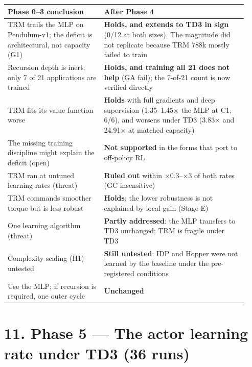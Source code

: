 \documentclass[11pt]{article}
\begin{document}
\begin{center}\small\begin{tabular}{>{\raggedright\arraybackslash}p{0.375\linewidth}>{\raggedright\arraybackslash}p{0.559\linewidth}}
\toprule
Phase 0--3 conclusion & After Phase 4 \\
\midrule
TRM trails the MLP on Pendulum-v1; the deficit is architectural, not capacity (G1) & \textbf{Holds, and extends to TD3 in sign} (0/12 at both sizes). The magnitude did not replicate because TRM 788k mostly failed to train \\
Recursion depth is inert; only 7 of 21 applications are trained & \textbf{Holds, and training all 21 does not help} (GA fail); the 7-of-21 count is now verified directly \\
TRM fits its value function worse & \textbf{Holds} with full gradients and deep supervision (1.35--1.45$\times$ the MLP at C1, 6/6), and worsens under TD3 (3.83$\times$ and 24.91$\times$ at matched capacity) \\
The missing training discipline might explain the deficit (open) & \textbf{Not supported} in the forms that port to off-policy RL \\
TRM ran at untuned learning rates (threat) & \textbf{Ruled out} within $\times$0.3--$\times$3 of both rates (GC insensitive) \\
TRM commands smoother torque but is less robust & \textbf{Holds}; the lower robustness is not explained by local gain (Stage E) \\
One learning algorithm (threat) & \textbf{Partly addressed}: the MLP transfers to TD3 unchanged; TRM is fragile under TD3 \\
Complexity scaling (H1) untested & \textbf{Still untested}: IDP and Hopper were not learned by the baseline under the pre-registered conditions \\
Use the MLP; if recursion is required, one outer cycle & \textbf{Unchanged} \\
\bottomrule
\end{tabular}\end{center}



\medskip



\section*{11. Phase 5 --- The actor learning rate under TD3 (36 runs)}
\end{document}
